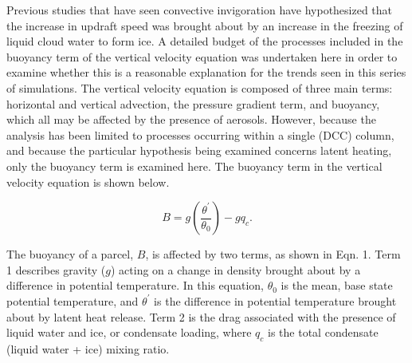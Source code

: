 Previous studies that have seen convective invigoration \citep{Andreae:2004p32,Khain:2005p71,vandenHeever:2006p1147,Rosenfeld:2008p24,taoreview} have hypothesized that the increase in updraft speed was brought about by an increase in the freezing of liquid cloud water to form ice.  A detailed budget of the processes included in the buoyancy term of the vertical velocity equation was undertaken here in order to examine whether this is a reasonable explanation for the trends seen in this series of simulations.  The vertical velocity equation is composed of three main terms: horizontal and vertical advection, the pressure gradient term, and buoyancy, which all may be affected by the presence of aerosols.  However, because the analysis has been limited to processes occurring within a single (DCC) column, and because the particular hypothesis being examined concerns latent heating, only the buoyancy term is examined here.  The buoyancy term in the vertical velocity equation is shown below.

\begin{equation}
B=g(\frac{\theta^{\prime}}{\theta_{0}})-gq_{c}.
\end{equation}

The buoyancy of a parcel, $B$, is affected by two terms, as shown in Eqn. 1.  Term 1 describes gravity ($g$) acting on a change in density brought about by a difference in potential temperature.  In this equation, $\theta_{0}$ is the mean, base state potential temperature, and $\theta^{\prime}$ is the difference in potential temperature brought about by latent heat release.  Term 2 is the drag associated with the presence of liquid water and ice, or condensate loading, where $q_{c}$ is the total condensate (liquid water + ice) mixing ratio.  

